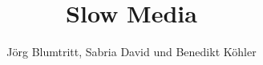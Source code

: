 \documentclass{scrbook}
\begin{document}
\title{Slow Media}
\author{Jörg Blumtritt, Sabria David und Benedikt Köhler}
\date{}
\maketitle
 
\end{document}

